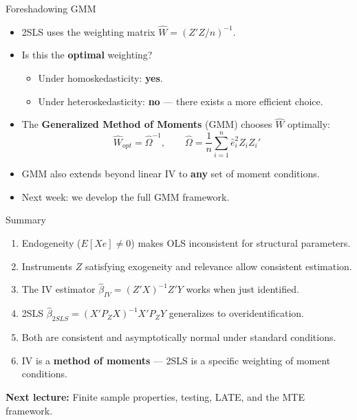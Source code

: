\documentclass[aspectratio=169, handout]{beamer}
\numberwithin{equation}{section}
\begin{document}
\begin{frame}{Foreshadowing GMM}
\begin{itemize}
\item 2SLS uses the weighting matrix $\hat{W}=(Z'Z/n)^{-1}$.
\item Is this the \textbf{optimal} weighting?
\begin{itemize}
\item Under homoskedasticity: \textbf{yes}.
\item Under heteroskedasticity: \textbf{no} --- there exists a more efficient choice.
\end{itemize}
\item The \textbf{Generalized Method of Moments} (GMM) chooses $\hat{W}$ optimally:
$$\hat{W}_{opt} = \hat{\Omega}^{-1}, \qquad \hat{\Omega} = \frac{1}{n}\sum_{i=1}^n \hat{e}_i^2 Z_iZ_i'$$
\item GMM also extends beyond linear IV to \textbf{any} set of moment conditions.
\item \alert{Next week:} we develop the full GMM framework.
\end{itemize}
\end{frame}


\begin{frame}{Summary}
\begin{enumerate}
\item Endogeneity ($E[Xe]\neq 0$) makes OLS inconsistent for structural parameters.
\item Instruments $Z$ satisfying exogeneity and relevance allow consistent estimation.
\item The IV estimator $\hat{\beta}_{IV}=(Z'X)^{-1}Z'Y$ works when just identified.
\item 2SLS $\hat{\beta}_{2SLS}=(X'P_ZX)^{-1}X'P_ZY$ generalizes to overidentification.
\item Both are consistent and asymptotically normal under standard conditions.
\item IV is a \textbf{method of moments} --- 2SLS is a specific weighting of moment conditions.
\end{enumerate}
\vspace{0.2cm}
\begin{tcolorbox}[colback=blue!5, colframe=blue!50]
\textbf{Next lecture:} Finite sample properties, testing, LATE, and the MTE framework.
\end{tcolorbox}
\end{frame}
\end{document}
